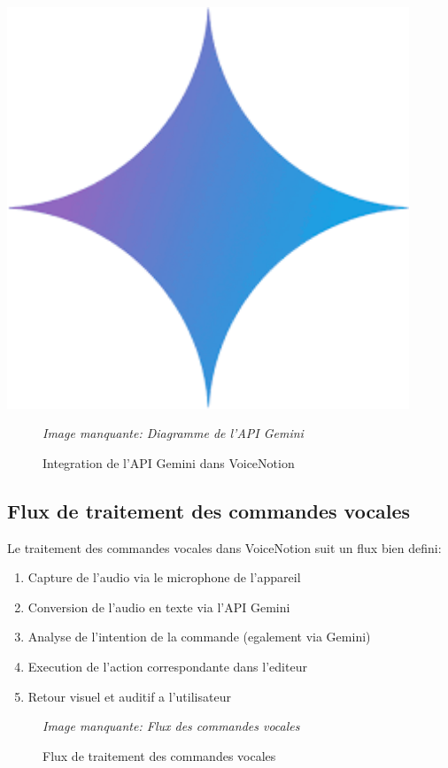 \begin{minipage}{0.25\textwidth}
\centering
\includegraphics[width=0.9\textwidth]{assets/docs/gemini.png}
\end{minipage}

\begin{figure}[H]
\centering
\textit{Image manquante: Diagramme de l'API Gemini}
\caption{Integration de l'API Gemini dans VoiceNotion}
\label{fig:gemini-api}
\end{figure}

\subsection{Flux de traitement des commandes vocales}
Le traitement des commandes vocales dans VoiceNotion suit un flux bien defini:
\begin{enumerate}
    \item Capture de l'audio via le microphone de l'appareil
    \item Conversion de l'audio en texte via l'API Gemini
    \item Analyse de l'intention de la commande (egalement via Gemini)
    \item Execution de l'action correspondante dans l'editeur
    \item Retour visuel et auditif a l'utilisateur
\end{enumerate}

\begin{figure}[H]
\centering
\textit{Image manquante: Flux des commandes vocales}
\caption{Flux de traitement des commandes vocales}
\label{fig:voice-commands-flow}
\end{figure}

